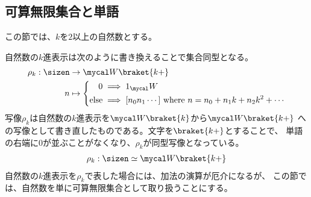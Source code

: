 \subsection{可算無限集合と単語}\label{s2:可算無限集合と単語} %
	この節では、$k$を$2$以上の自然数とする。

	自然数の$k$進表示は次のように書き換えることで集合同型となる。
	\begin{equation*}\begin{split}
		\rho_k:\sizen &\to \Word\braket{k+} \\
		n &\mapsto \left\{\begin{split}
			0 &\implies 1_\Word \\
			\text{else} &\implies [n_0n_1\cdots] \text{ where }
				n = n_0 + n_1k + n_2k^2 + \cdots\\
		\end{split}\right. \\
	\end{split}\end{equation*}
	写像$\rho_k$は自然数の$k$進表示を$\Word\braket{k}$から$\Word\braket{k+}$
	への写像として書き直したものである。文字を$\braket{k+}$とすることで、
	単語の右端に$0$が並ぶことがなくなり、$\rho_k$が同型写像となっている。
	\begin{equation*}\begin{split}
		\rho_k:\sizen\simeq\Word\braket{k+}
	\end{split}\end{equation*}
	自然数の$k$進表示を$\rho_k$で表した場合には、加法の演算が厄介になるが、
	この節では、自然数を単に可算無限集合として取り扱うことにする。

